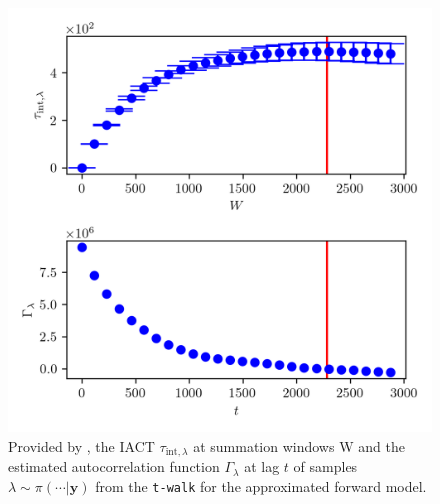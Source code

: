 \begin{figure}[ht!]
	\centering
	\includegraphics{UwerrTauIntTWalk1.png}
	\caption[IACT and autocorrelation function of samples $\lambda \sim \pi(\cdot|\bm{y})$, for approximated model.]{Provided by \cite{drikHesse}, the IACT $\tau_{\text{int},\lambda}$ at summation windows W and the estimated autocorrelation function $\Gamma_{\lambda}$ at lag $t$ of samples $\lambda \sim \pi( \cdots| \bm{y})$ from the \texttt{t-walk} for the approximated forward model.}
	\label{fig:TWalkIATC2}
\end{figure}


